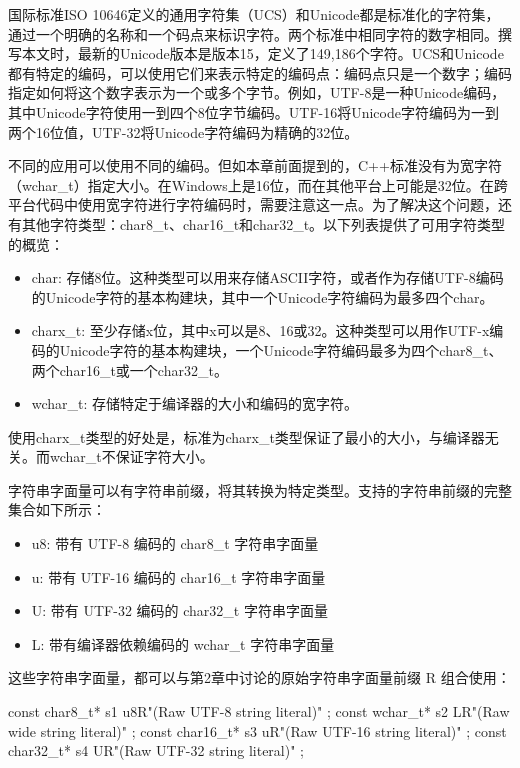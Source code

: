 国际标准ISO 10646定义的通用字符集（UCS）和Unicode都是标准化的字符集，通过一个明确的名称和一个码点来标识字符。两个标准中相同字符的数字相同。撰写本文时，最新的Unicode版本是版本15，定义了149,186个字符。UCS和Unicode都有特定的编码，可以使用它们来表示特定的编码点：编码点只是一个数字；编码指定如何将这个数字表示为一个或多个字节。例如，UTF-8是一种Unicode编码，其中Unicode字符使用一到四个8位字节编码。UTF-16将Unicode字符编码为一到两个16位值，UTF-32将Unicode字符编码为精确的32位。

不同的应用可以使用不同的编码。但如本章前面提到的，C++标准没有为宽字符（wchar\_t）指定大小。在Windows上是16位，而在其他平台上可能是32位。在跨平台代码中使用宽字符进行字符编码时，需要注意这一点。为了解决这个问题，还有其他字符类型：char8\_t、char16\_t和char32\_t。以下列表提供了可用字符类型的概览：

\begin{itemize}
\item
char: 存储8位。这种类型可以用来存储ASCII字符，或者作为存储UTF-8编码的Unicode字符的基本构建块，其中一个Unicode字符编码为最多四个char。

\item
charx\_t: 至少存储x位，其中x可以是8、16或32。这种类型可以用作UTF-x编码的Unicode字符的基本构建块，一个Unicode字符编码最多为四个char8\_t、两个char16\_t或一个char32\_t。

\item
wchar\_t: 存储特定于编译器的大小和编码的宽字符。
\end{itemize}

使用charx\_t类型的好处是，标准为charx\_t类型保证了最小的大小，与编译器无关。而wchar\_t不保证字符大小。

字符串字面量可以有字符串前缀，将其转换为特定类型。支持的字符串前缀的完整集合如下所示：

\begin{itemize}
\item
u8: 带有 UTF-8 编码的 char8\_t 字符串字面量

\item
u: 带有 UTF-16 编码的 char16\_t 字符串字面量

\item
U: 带有 UTF-32 编码的 char32\_t 字符串字面量

\item
L: 带有编译器依赖编码的 wchar\_t 字符串字面量
\end{itemize}

这些字符串字面量，都可以与第2章中讨论的原始字符串字面量前缀 R 组合使用：

\begin{cpp}
const char8_t* s1 { u8R"(Raw UTF-8 string literal)" };
const wchar_t* s2 { LR"(Raw wide string literal)" };
const char16_t* s3 { uR"(Raw UTF-16 string literal)" };
const char32_t* s4 { UR"(Raw UTF-32 string literal)" };
\end{cpp}

